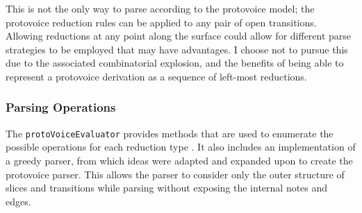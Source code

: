 \documentclass[12pt,a4paper,twoside,openright]{report}
\theoremstyle{definition}
\begin{document}



This is not the only way to parse according to the protovoice model; the protovoice reduction rules can be applied to any pair of open transitions.
Allowing reductions at any point along the surface could allow for different parse strategies to be employed that may have advantages.
I choose not to pursue this due to the associated combinatorial explosion, and the benefits of being able to represent a protovoice derivation as a sequence of left-most reductions.

\subsubsection{Parsing Operations}
The \texttt{protoVoiceEvaluator} \cite{finkensiepModelingInferringProtovoice2021} provides methods that are used to enumerate the possible operations for each reduction type \footnotemark. It also includes an implementation of a greedy parser, from which ideas were adapted and expanded upon to create the protovoice parser. 
This allows the parser to consider only the outer structure of slices and transitions while parsing without exposing the internal notes and edges. 
\end{document}
